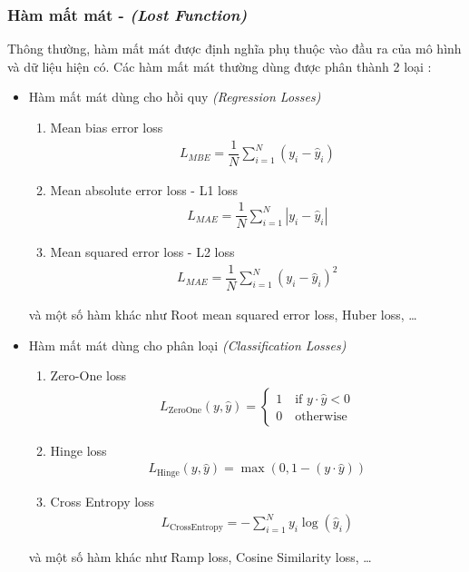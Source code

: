 \subsubsection{Hàm mất mát - \textit{(Lost Function)}}
Thông thường, hàm mất mát được định nghĩa phụ thuộc vào đầu ra của mô hình và dữ liệu hiện có. Các hàm mất mát thường dùng được phân thành 2 loại \cite{ciampiconi2023surveytaxonomylossfunctions}:
\begin{itemize}
    \item Hàm mất mát dùng cho hồi quy \textit{(Regression Losses)}
          \begin{enumerate}
              \item Mean bias error loss
                    \begin{align}
                        L_{MBE}=\dfrac{1}{N}\sum_{i=1}^N\left(y_i-\hat y_i\right)
                    \end{align}
              \item Mean absolute error loss - L1 loss
                    \begin{align}
                        L_{MAE}=\dfrac{1}{N}\sum_{i=1}^N\left|y_i-\hat y_i\right|
                    \end{align}
              \item Mean squared error loss - L2 loss
                    \begin{align}
                        L_{MAE}=\dfrac{1}{N}\sum_{i=1}^N\left(y_i-\hat y_i\right)^2
                    \end{align}
          \end{enumerate}
          và một số hàm khác như Root mean squared error loss, Huber loss, \dots
    \item Hàm mất mát dùng cho phân loại \textit{(Classification Losses)}
          \begin{enumerate}
              \item Zero-One loss
                    \begin{align}
                        L_\text{ZeroOne}(y,\hat y)=
                        \begin{cases}
                            1\quad\text{if }y\cdot\hat y<0 \\
                            0\quad\text{otherwise}
                        \end{cases}
                    \end{align}
              \item Hinge loss
                    \begin{align}
                        L_\text{Hinge}(y,\hat y)=\max(0,1-(y\cdot\hat y))
                    \end{align}
              \item Cross Entropy loss
                    \begin{align}
                        L_\text{CrossEntropy}=-\sum_{i=1}^N y_i\log(\hat y_i)
                    \end{align}
          \end{enumerate}
          và một số hàm khác như Ramp loss, Cosine Similarity loss, \dots
\end{itemize}


